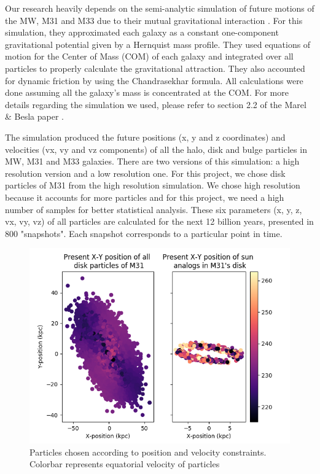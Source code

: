 \documentclass[iop]{emulateapj}
\begin{document}
    Our research heavily depends on the semi-analytic simulation of future motions of the MW, M31 and M33 due to their mutual gravitational interaction \cite{marel}. For this simulation, they approximated each galaxy as a constant one-component gravitational potential given by a Hernquist mass profile. They used equations of motion for the Center of Mass (COM) of each galaxy and integrated over all particles to properly calculate the gravitational attraction. They also accounted for dynamic friction by using the Chandrasekhar formula. All calculations were done assuming all the galaxy's mass is concentrated at the COM. For more details regarding the simulation we used, please refer to section 2.2 of the Marel & Besla paper \cite{marel}. \medskip
    
    The simulation produced the future positions (x, y and z coordinates) and velocities (vx, vy and vz components) of all the halo, disk and bulge particles in MW, M31 and M33 galaxies. There are two versions of this simulation: a high resolution version and a low resolution one. For this project, we chose disk particles of M31 from the high resolution simulation. We chose high resolution because it accounts for more particles and for this project, we need a high number of samples for better statistical analysis. These six parameters (x, y, z, vx, vy, vz) of all particles are calculated for the next 12 billion years, presented in 800 "snapshots". Each snapshot corresponds to a particular point in time. \medskip
    
    \begin{figure}[h]
        \centering
        \includegraphics[width=\columnwidth]{masking}
        \caption{Particles chosen according to position and velocity constraints. Colorbar represents equatorial velocity of particles}
        \label{fig:separation}
    \end{figure}
    
\end{document}
